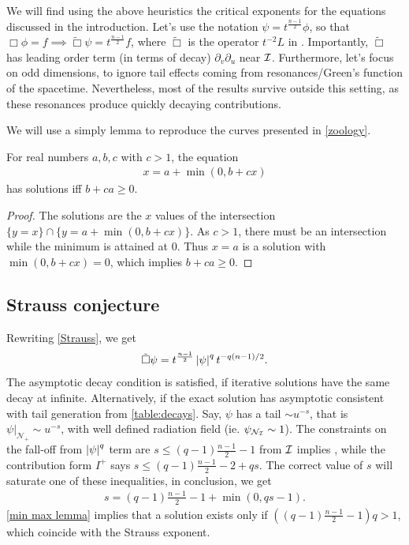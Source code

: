 \documentclass[11pt, oneside]{amsart}
\begin{document}
	We will find using the above heuristics the critical exponents for the equations discussed in the introduction. Let's use the notation $\psi=t^{\frac{n-1}{2}}\phi$, so that $\Box\phi=f\implies\tilde{\Box}\psi=t^{\frac{n-1}{2}}f$, where $\tilde{\Box}$ is the operator $t^{-2}L$ in \cite{hintz_stability_2020}. Importantly, $\tilde{\Box}$ has leading order term (in terms of decay) $\partial_v\partial_u$ near $\mathcal{I}$. Furthermore, let's focus on odd dimensions, to ignore tail effects coming from resonances/Green's function of the spacetime. Nevertheless, most of the results survive outside this setting, as these resonances produce quickly decaying contributions.
	
	We will use a simply lemma to reproduce the curves presented in \cref{zoology}.
	\begin{lemma}\label{min max lemma}
		For real numbers $a,b,c$ with $c>1$, the equation
		\begin{equation*}
			\begin{gathered}
				x=a+\min(0,b+cx)
			\end{gathered}
		\end{equation*}
		has solutions iff $b+ca\geq0$.
		
	\end{lemma}
	\begin{proof}
		The solutions are the $x$ values of the intersection  $\{y=x\}\cap\{y=a+\min(0,b+cx)\}$. As $c>1$, there must be an intersection while the minimum is attained at $0$. Thus $x=a$ is a solution with $\min(0,b+cx)=0$, which implies $b+ca\geq0$.
	\end{proof}
	
	\subsection{Strauss conjecture}
	Rewriting \eqref{Strauss}, we get 
	\begin{equation*}
		\begin{gathered}
			\tilde{\Box}\psi=t^{\frac{n-1}{2}}\left\lvert \psi\right\rvert^q t^{-q(n-1)/2}.
		\end{gathered}
	\end{equation*}
	The asymptotic decay condition is satisfied, if iterative solutions have the same decay at infinite. Alternatively, if the exact solution has asymptotic consistent with tail generation from \cref{table:decays}. Say, $\psi$ has a tail $\sim  u^{-s}$, that is $\psi|_{\mathcal{N}_+}\sim u^{-s}$, with well defined radiation field (ie. $\psi_{\mathcal{N}_{\mathcal{I}}}\sim1$). The constraints on the fall-off from $\left\lvert \psi\right\rvert^q$ term are $s\leq (q-1)\frac{n-1}{2}-1$ from $\mathcal{I}$ implies , while the contribution form $I^+$ says $s\leq (q-1)\frac{n-1}{2}-2+qs$. The correct value of $s$ will saturate one of these inequalities, in conclusion, we get
	\begin{equation*}
		\begin{gathered}
			s=(q-1)\frac{n-1}{2}-1+\min(0,qs-1).
		\end{gathered}
	\end{equation*}
	\cref{min max lemma}  implies that a solution exists only if $((q-1)\frac{n-1}{2}-1)q>1$, which coincide with the Strauss exponent.
\end{document}
